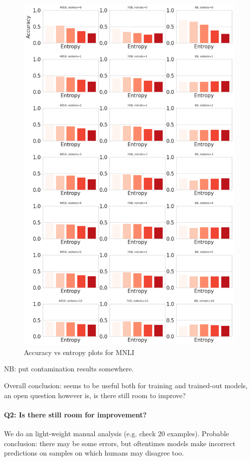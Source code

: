 \begin{figure}
    \centering
    \includegraphics[width=0.98\linewidth]{nli_plots/mnli_matched_entropy_acc.png}
    \caption{Accuracy vs entropy plots for MNLI}
    \label{fig:entropy_accuracy_mnli}
\end{figure}

NB: put contamination results somewhere.

Overall conclusion: seems to be useful both for training and trained-out models, an open question however is, is there still room to improve?

\paragraph{Q2: Is there still room for improvement?}
We do an light-weight manual analysis (e.g. check 20 examples).
Probable conclusion: there may be some errors, but oftentimes models make incorrect predictions on samples on which humans may disagree too.

